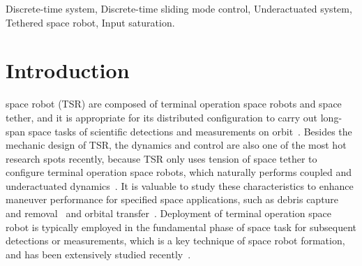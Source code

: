 \documentclass[10pt,onecolumn,draftcls]{IEEEtran}
\begin{document}
\begin{IEEEkeywords}
Discrete-time system, Discrete-time sliding mode control, Underactuated system, Tethered space robot, Input saturation.
\end{IEEEkeywords}






\IEEEpeerreviewmaketitle



\section{Introduction}

 space robot (TSR) are composed of terminal operation space robots and space tether, and it is appropriate for its distributed configuration to carry out  long-span space tasks of scientific detections and measurements on orbit~\cite{yu2018review}. 
Besides the mechanic design of TSR, the dynamics and control are also one of the most hot research spots recently, because TSR only uses tension of space tether to configure terminal operation space robots, which naturally performs coupled and underactuated dynamics~\cite{ma2017dynamic}. 
It is valuable to study these characteristics to enhance maneuver performance for specified space applications, such as debris capture and removal~\cite{wang2015coordinated,Zhang2017,Zhang2017JGCD,Huang2017,dai2018post} and orbital transfer~\cite{liu2017tether}.
Deployment of terminal operation space robot is typically employed in the fundamental phase of space task for subsequent detections or measurements, which is a key technique of space robot formation, and has been extensively studied recently~\cite{yu2017analytical,ma2018pure}.
\end{document}
